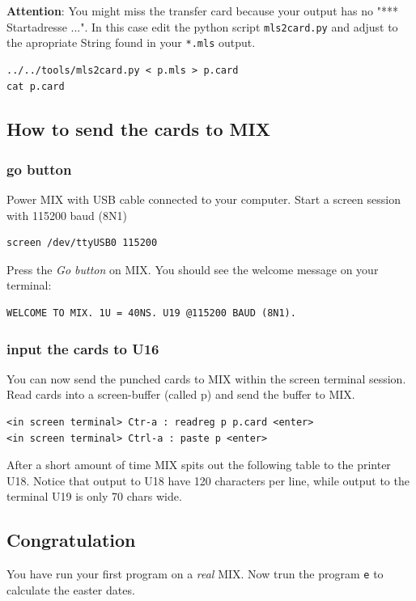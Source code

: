 \documentclass[a4paper,ngerman]{scrartcl}
\begin{document}
\textbf{Attention}: You might miss the transfer card because your output has no "*** Startadresse ...".
In this case edit the python script \lstinline|mls2card.py| and adjust to the apropriate String found in your \lstinline|*.mls| output.


\begin{lstlisting}[numbers=none,frame=none]
../../tools/mls2card.py < p.mls > p.card
cat p.card
\end{lstlisting}




\subsection{How to send the cards to MIX}
\subsubsection{go button}
Power MIX with USB cable connected to your computer.
Start a screen session with 115200 baud (8N1)
\begin{lstlisting}[numbers=none,frame=none]
screen /dev/ttyUSB0 115200
\end{lstlisting}

Press the \textit{Go button} on MIX. You should see the welcome message on your terminal:
\begin{lstlisting}
WELCOME TO MIX. 1U = 40NS. U19 @115200 BAUD (8N1).                    
\end{lstlisting}

\subsubsection{input the cards to U16}
You can now send the punched cards to MIX within the screen terminal session.
Read cards into a screen-buffer (called p) and send the buffer to MIX.
\begin{lstlisting}[numbers=none,frame=none]
<in screen terminal> Ctr-a : readreg p p.card <enter>
<in screen terminal> Ctrl-a : paste p <enter>
\end{lstlisting}

After a short amount of time MIX spits out the following table to the printer U18. Notice that output to U18 have 120 characters per line, while output to the terminal U19 is only 70 chars wide.


\subsection{Congratulation}
You have run your first program on a \textit{real} MIX.
Now trun the program \lstinline|e| to calculate the easter dates.
\end{document}
